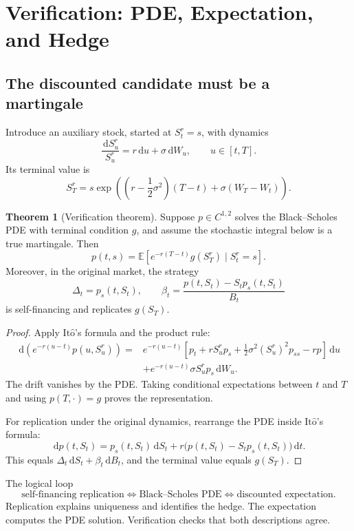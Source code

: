 \documentclass[10pt]{article}
\newcommand{\E}{\mathbb E}
\newcommand{\1}{\mathbf 1}
\newcommand{\dd}{\,\mathrm d}
\newcommand{\Ito}{\mathrm{It\hat{o}}}
\theoremstyle{definition}
\newtheorem{theorem}[definition]{Theorem}
\begin{document}
\section{Verification: PDE, Expectation, and Hedge}

\subsection{The discounted candidate must be a martingale}

Introduce an auxiliary stock, started at \(S_t^r=s\), with dynamics
\[
\frac{\dd S_u^r}{S_u^r}
=r\dd u+\sigma\dd W_u,
\qquad u\in[t,T].
\]
Its terminal value is
\[
S_T^r
=s\exp\left(
\left(r-\frac12\sigma^2\right)(T-t)
+\sigma(W_T-W_t)
\right).
\]

\begin{theorem}[Verification theorem]
Suppose \(p\in C^{1,2}\) solves the Black--Scholes PDE with terminal
condition \(g\), and assume the stochastic integral below is a true
martingale. Then
\[
\boxed{
p(t,s)
=\E\left[
e^{-r(T-t)}g(S_T^r)\mid S_t^r=s
\right].}
\]
Moreover, in the original market, the strategy
\[
\Delta_t=p_s(t,S_t),
\qquad
\beta_t=\frac{p(t,S_t)-S_tp_s(t,S_t)}{B_t}
\]
is self-financing and replicates \(g(S_T)\).
\end{theorem}

\begin{proof}
Apply \(\Ito\)'s formula and the product rule:
\[
\begin{aligned}
\dd\left(e^{-r(u-t)}p(u,S_u^r)\right)
={}&e^{-r(u-t)}
\left[
p_t+rS_u^rp_s
+\frac12\sigma^2(S_u^r)^2p_{ss}-rp
\right]\dd u\\
&+e^{-r(u-t)}\sigma S_u^rp_s\dd W_u.
\end{aligned}
\]
The drift vanishes by the PDE. Taking conditional expectations between
\(t\) and \(T\) and using \(p(T,\cdot)=g\) proves the representation.

For replication under the original dynamics, rearrange the PDE inside
\(\Ito\)'s formula:
\[
\dd p(t,S_t)
=p_s(t,S_t)\dd S_t
+r\bigl(p(t,S_t)-S_tp_s(t,S_t)\bigr)\dd t.
\]
This equals
\(\Delta_t\dd S_t+\beta_t\dd B_t\), and the terminal value equals
\(g(S_T)\).
\end{proof}

\begin{keyidea}{The logical loop}
\[
\boxed{
\text{self-financing replication}
\Longleftrightarrow
\text{Black--Scholes PDE}
\Longleftrightarrow
\text{discounted expectation}.}
\]
Replication explains uniqueness and identifies the hedge. The expectation
computes the PDE solution. Verification checks that both descriptions agree.
\end{keyidea}
\end{document}
